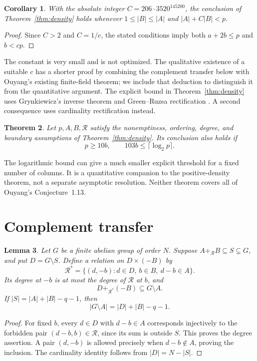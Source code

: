 \documentclass[11pt]{article}
\newtheorem{theorem}{Theorem}
\newtheorem{lemma}[theorem]{Lemma}
\newtheorem{corollary}[theorem]{Corollary}
\theoremstyle{remark}
\newcommand{\rs}{+_{\mathcal R}}
\begin{document}
\begin{corollary}\label{cor:linear}
With the absolute integer $C=206\cdot3520^{145200}$, the conclusion of Theorem~\ref{thm:density} holds whenever $1\le|B|\le|A|$ and $|A|+C|B|<p$.
\end{corollary}
\begin{proof}
Since $C>2$ and $C=1/c$, the stated conditions imply both $a+2b\le p$ and $b<cp$.
\end{proof}

The constant is very small and is not optimized. The qualitative existence of a suitable $c$ has a shorter proof by combining the complement transfer below with Ouyang's existing finite-field theorem; we include that deduction to distinguish it from the quantitative argument. The explicit bound in Theorem~\ref{thm:density} uses Grynkiewicz's inverse theorem \cite{Grynkiewicz} and Green--Ruzsa rectification \cite{GR}. A second consequence uses cardinality rectification instead.

\begin{theorem}\label{thm:log}
Let $p,A,B,\mathcal R$ satisfy the nonemptiness, ordering, degree, and boundary assumptions of Theorem~\ref{thm:density}. Its conclusion also holds if
\[
 p\ge10b,\qquad 103b\le\lceil\log_2p\rceil.
\]
\end{theorem}

The logarithmic bound can give a much smaller explicit threshold for a fixed number of columns. It is a quantitative companion to the positive-density theorem, not a separate asymptotic resolution. Neither theorem covers all of Ouyang's Conjecture~1.13.

\section{Complement transfer}
\begin{lemma}\label{lem:dual}
Let $G$ be a finite abelian group of order $N$. Suppose $A\rs B\subseteq S\subsetneq G$, and put $D=G\setminus S$. Define a relation on $D\times(-B)$ by
\[
 \mathcal R^*=\{(d,-b):d\in D,\ b\in B,\ d-b\in A\}.
\]
Its degree at $-b$ is at most the degree of $\mathcal R$ at $b$, and
\[
 D+_{\mathcal R^*}(-B)\subseteq G\setminus A.
\]
If $|S|=|A|+|B|-q-1$, then
\[
 |G\setminus A|=|D|+|B|-q-1.
\]
\end{lemma}
\begin{proof}
For fixed $b$, every $d\in D$ with $d-b\in A$ corresponds injectively to the forbidden pair $(d-b,b)\in\mathcal R$, since its sum is outside $S$. This proves the degree assertion. A pair $(d,-b)$ is allowed precisely when $d-b\notin A$, proving the inclusion. The cardinality identity follows from $|D|=N-|S|$.
\end{proof}
\end{document}
